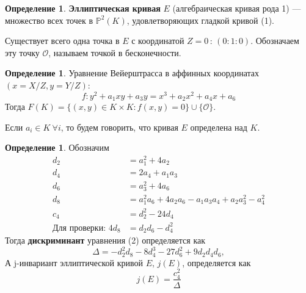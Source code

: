 \documentclass[12pt]{article}
\newcommand{\PP}{{{\mathbb P}}}
\newcommand*{\union}{\mathbin{\cup}}
\newcommand{\bigO}{\mathcal{O}}
\theoremstyle{definition}
\newtheorem{definition}[theorem]{Определение}
\theoremstyle{definition}
\theoremstyle{definition}
\begin{document}
            \begin{definition} 
                \textbf{Эллиптическая кривая} $E$ (алгебраическая кривая рода 1) — множество всех точек в $\PP^2(K)$, удовлетворяющих гладкой кривой (1). 
                
                Существует всего одна точка в $E$ с координатой $Z=0\,$: $(0:1:0)$. Обозначаем эту точку $\bigO$, называем точкой в бесконечности. 
            \end{definition}
            
            \begin{definition} 
                Уравнение Вейерштрасса в аффинных координатах $(x=X/Z, y=Y/Z)$:
                \begin{equation}\label{eq:weierstrassequation}
                    f: y^2+a_1xy + a_3y = x^3 + a_2x^2 + a_4x + a_6
                \end{equation}
                Тогда $F(K) = \{ (x,y) \in K \times K: f(x,y)=0 \} \union \{\bigO\}$.
                
                Если $a_i \in K \  \forall i$, то будем говорить, что кривая $E$ определена над $K$.
            \end{definition}
            
            \begin{definition}
                Обозначим
                \begin{align}
                    d_2 &= a_1^2 + 4a_2 \\ \nonumber
                    d_4 &= 2a_4 + a_1a_3 \\ \nonumber
                    d_6 &= a_3^2 + 4a_6 \\ \nonumber
                    d_8 &= a_1^2a_6 + 4a_2a_6 - a_1a_3a_4 + a_2a_3^2 - a_4^2 \\ \nonumber
                    c_4 &= d_2^2 - 24d_4 \\ \nonumber
                    \text{Для проверки: } 4d_8 &= d_2d_6 - d_4^2
                \end{align}
                Тогда \textbf{дискриминант} уравнения (2) определяется как 
                \[
                    \Delta = -d_2^2d_8 - 8d_4^3-27d_6^2+9d_2d_4d_6,
                \]
                А j-инвариант эллиптической кривой $E$, $j(E)$, определяется как 
                \[
                    j(E) = \frac{c_4^2}{\Delta}
                \]
            \end{definition}
            
\end{document}
